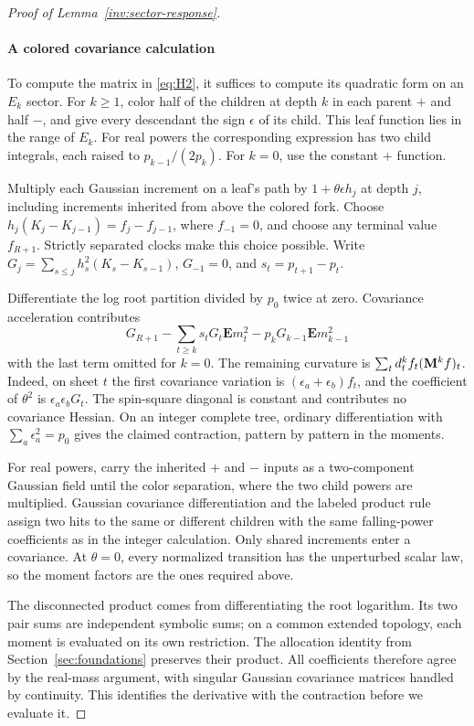 \begin{proof}[Proof of Lemma~\ref{inv:sector-response}]
\paragraph{A colored covariance calculation}
To compute the matrix in \eqref{eq:H2}, it suffices to compute its
quadratic form on an \(E_k\) sector. For \(k\ge1\), color half of the
children at depth \(k\) in each parent \(+\) and half \(-\), and give
every descendant the sign \(\epsilon\) of its child. This leaf function
lies in the range of \(E_k\). For real powers the corresponding
expression has two child integrals, each raised to
\(p_{k-1}/(2p_k)\). For \(k=0\), use the constant \(+\) function.

Multiply each Gaussian increment on a leaf's path by
\(1+\theta\epsilon h_j\) at depth \(j\), including increments
inherited from above the colored fork. Choose
\(h_j(K_j-K_{j-1})=f_j-f_{j-1}\), where \(f_{-1}=0\), and choose
any terminal value \(f_{R+1}\). Strictly separated clocks make this
choice possible. Write
\(G_j=\sum_{s\le j}h_s^2(K_s-K_{s-1})\), \(G_{-1}=0\), and
\(s_t=p_{t+1}-p_t\).

Differentiate the log root partition divided by \(p_0\) twice at zero. Covariance acceleration contributes
\[
 G_{R+1}-\sum_{t\ge k}s_t G_t\mathbf E m_t^2-p_k G_{k-1}\mathbf E m_{k-1}^2
\]
with the last term omitted for \(k=0\). The remaining curvature is
\(\sum_t d_t^k f_t({\bf M}^k f)_t\). Indeed, on sheet \(t\) the
first covariance variation is \((\epsilon_a+\epsilon_b)f_t\), and the
coefficient of \(\theta^2\) is \(\epsilon_a\epsilon_bG_t\). The
spin-square diagonal is constant and contributes no covariance Hessian.
On an integer complete tree, ordinary differentiation with
\(\sum_a\epsilon_a^2=p_0\) gives the claimed contraction, pattern by
pattern in the moments.

For real powers, carry the inherited \(+\) and \(-\) inputs as a
two-component Gaussian field until the color separation, where the two
child powers are multiplied. Gaussian covariance differentiation and
the labeled product rule assign two hits to the same or different
children with the same falling-power coefficients as in the integer
calculation. Only shared increments enter a covariance. At
\(\theta=0\), every normalized transition has the unperturbed scalar
law, so the moment factors are the ones required above.

The disconnected product comes from differentiating the root logarithm.
Its two pair sums are independent symbolic sums; on a common extended
topology, each moment is evaluated on its own restriction. The
allocation identity from Section~\ref{sec:foundations} preserves their
product. All coefficients therefore agree by the real-mass argument,
with singular Gaussian covariance matrices handled by continuity. This
identifies the derivative with the contraction before we evaluate it.


\end{proof}

